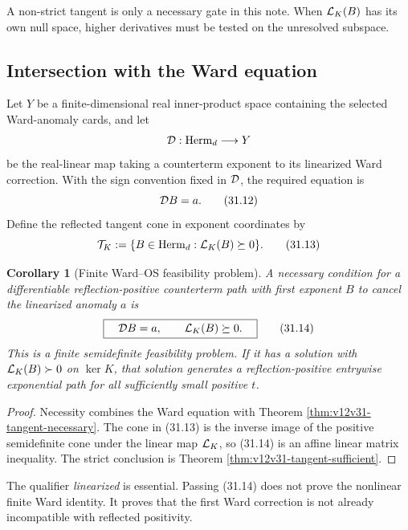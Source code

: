 \documentclass[11pt]{article}
\newtheorem{corollary}[theorem]{Corollary}
\theoremstyle{remark}
\begin{document}
A non-strict tangent is only a necessary gate in this note.  When
\({\cal L}_K(B)\) has its own null space, higher derivatives must be
tested on the unresolved subspace.

\subsection{Intersection with the Ward equation}

Let \(Y\) be a finite-dimensional real inner-product space containing
the selected Ward-anomaly cards, and let
\[
 {\cal D}:{\rm Herm}_d\longrightarrow Y
\]
be the real-linear map taking a counterterm exponent to its
linearized Ward correction.  With the sign convention fixed in
\({\cal D}\), the required equation is
\begin{equation}
                         {\cal D}B=a.             \tag{31.12}
\end{equation}
Define the reflected tangent cone in exponent coordinates by
\begin{equation}
 {\cal T}_K
 :=
 \{B\in{\rm Herm}_d:{\cal L}_K(B)\succeq0\}.      \tag{31.13}
\end{equation}

\begin{corollary}[Finite Ward--OS feasibility problem]
\label{cor:v12v31-feasibility}
A necessary condition for a differentiable reflection-positive
counterterm path with first exponent \(B\) to cancel the linearized
anomaly \(a\) is
\begin{equation}
 \boxed{\quad {\cal D}B=a,\qquad
               {\cal L}_K(B)\succeq0.\quad}       \tag{31.14}
\end{equation}
This is a finite semidefinite feasibility problem.  If it has a
solution with
\({\cal L}_K(B)\succ0\) on \(\ker K\), that solution generates a
reflection-positive entrywise exponential path for all sufficiently
small positive \(t\).
\end{corollary}

\begin{proof}
Necessity combines the Ward equation with Theorem
\ref{thm:v12v31-tangent-necessary}.  The cone in (31.13) is the
inverse image of the positive semidefinite cone under the linear map
\({\cal L}_K\), so (31.14) is an affine linear matrix inequality.
The strict conclusion is Theorem
\ref{thm:v12v31-tangent-sufficient}.
\end{proof}

The qualifier \emph{linearized} is essential.  Passing (31.14) does
not prove the nonlinear finite Ward identity.  It proves that the
first Ward correction is not already incompatible with reflected
positivity.
\end{document}
